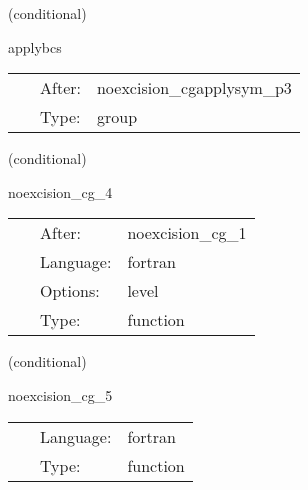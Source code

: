 \vspace{5mm}

   (conditional) 

\hspace{5mm} applybcs 

\hspace{5mm}{\it apply boundary conditions (symmetries) 3 } 


\hspace{5mm}

 \begin{tabular*}{160mm}{cll} 
~ & After:  & noexcision\_cgapplysym\_p3 \\ 
~ & Type:  & group \\ 
\end{tabular*} 


\vspace{5mm}

   (conditional) 

\hspace{5mm} noexcision\_cg\_4 

\hspace{5mm}{\it conjugate gradients step 4 } 


\hspace{5mm}

 \begin{tabular*}{160mm}{cll} 
~ & After:  & noexcision\_cg\_1 \\ 
~ & Language:  & fortran \\ 
~ & Options:  & level \\ 
~ & Type:  & function \\ 
\end{tabular*} 


\vspace{5mm}

   (conditional) 

\hspace{5mm} noexcision\_cg\_5 

\hspace{5mm}{\it conjugate gradients step 5 } 


\hspace{5mm}

 \begin{tabular*}{160mm}{cll} 
~ & Language:  & fortran \\ 
~ & Type:  & function \\ 
\end{tabular*} 


